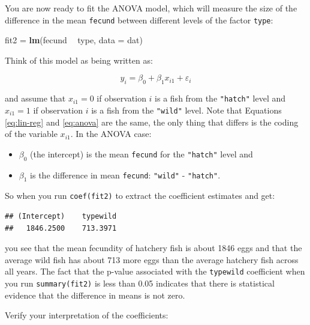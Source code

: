 \documentclass[]{book}
\newenvironment{Shaded}{\begin{snugshade}}{\end{snugshade}}
\newcommand{\KeywordTok}[1]{\textcolor[rgb]{0.13,0.29,0.53}{\textbf{#1}}}
\newcommand{\DataTypeTok}[1]{\textcolor[rgb]{0.13,0.29,0.53}{#1}}
\newcommand{\StringTok}[1]{\textcolor[rgb]{0.31,0.60,0.02}{#1}}
\newcommand{\OperatorTok}[1]{\textcolor[rgb]{0.81,0.36,0.00}{\textbf{#1}}}
\newcommand{\NormalTok}[1]{#1}
\providecommand{\tightlist}{%
  \setlength{\itemsep}{0pt}\setlength{\parskip}{0pt}}
\theoremstyle{definition}
\theoremstyle{definition}
\theoremstyle{definition}
\theoremstyle{remark}
\begin{document}
You are now ready to fit the ANOVA model, which will measure the size of
the difference in the mean \texttt{fecund} between different levels of
the factor \texttt{type}:

\begin{Shaded}
\begin{Highlighting}[]
\NormalTok{fit2 =}\StringTok{ }\KeywordTok{lm}\NormalTok{(fecund }\OperatorTok{~}\StringTok{ }\NormalTok{type, }\DataTypeTok{data =}\NormalTok{ dat)}
\end{Highlighting}
\end{Shaded}

Think of this model as being written as:

\begin{equation}
  y_i=\beta_0 + \beta_1 x_{i1} + \varepsilon_i
\label{eq:anova}
\end{equation}

and assume that \(x_{i1} = 0\) if observation \(i\) is a fish from the
\texttt{"hatch"} level and \(x_{i1} = 1\) if observation \(i\) is a fish
from the \texttt{"wild"} level. Note that Equations \eqref{eq:lin-reg} and
\eqref{eq:anova} are the same, the only thing that differs is the coding
of the variable \(x_{i1}\). In the ANOVA case:

\begin{itemize}
\tightlist
\item
  \(\beta_0\) (the intercept) is the mean \texttt{fecund} for the
  \texttt{"hatch"} level and
\item
  \(\beta_1\) is the difference in mean \texttt{fecund}: \texttt{"wild"}
  - \texttt{"hatch"}.
\end{itemize}

So when you run \texttt{coef(fit2)} to extract the coefficient estimates
and get:

\begin{verbatim}
## (Intercept)    typewild 
##   1846.2500    713.3971
\end{verbatim}

you see that the mean fecundity of hatchery fish is about 1846 eggs and
that the average wild fish has about 713 more eggs than the average
hatchery fish across all years. The fact that the p-value associated
with the \texttt{typewild} coefficient when you run
\texttt{summary(fit2)} is less than 0.05 indicates that there is
statistical evidence that the difference in means is not zero.

Verify your interpretation of the coefficients:
\end{document}
